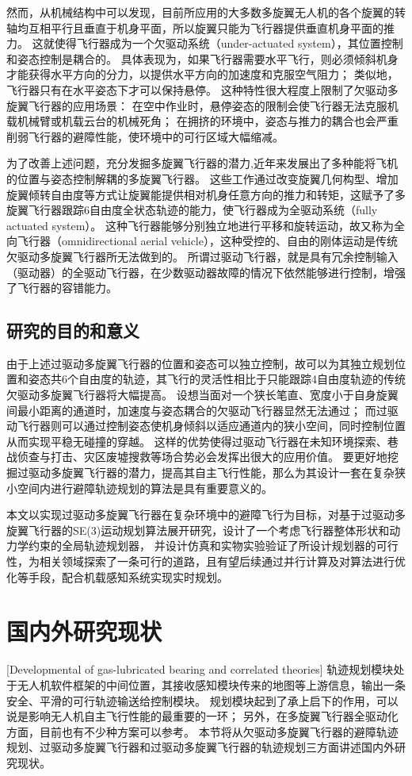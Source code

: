 然而，从机械结构中可以发现，目前所应用的大多数多旋翼无人机的各个旋翼的转轴均互相平行且垂直于机身平面，所以旋翼只能为飞行器提供垂直机身平面的推力。
这就使得飞行器成为一个欠驱动系统（under-actuated system）\cite{2012Underactuated}，其位置控制和姿态控制是耦合的。
具体表现为，如果飞行器需要水平飞行，则必须倾斜机身才能获得水平方向的分力，以提供水平方向的加速度和克服空气阻力；
类似地，飞行器只有在水平姿态下才可以保持悬停。
这种特性很大程度上限制了欠驱动多旋翼飞行器的应用场景：
在空中作业时，悬停姿态的限制会使飞行器无法克服机载机械臂或机载云台的机械死角；
在拥挤的环境中，姿态与推力的耦合也会严重削弱飞行器的避障性能，使环境中的可行区域大幅缩减。

为了改善上述问题，充分发掘多旋翼飞行器的潜力,近年来发展出了多种能将飞机的位置与姿态控制解耦的多旋翼飞行器。
这些工作通过改变旋翼几何构型、增加旋翼倾转自由度等方式让旋翼能提供相对机身任意方向的推力和转矩，这赋予了多旋翼飞行器跟踪6自由度全状态轨迹的能力，使飞行器成为全驱动系统（fully actuated system）。
这种飞行器能够分别独立地进行平移和旋转运动，故又称为全向飞行器（omnidirectional aerial vehicle），这种受控的、自由的刚体运动是传统欠驱动多旋翼飞行器所无法做到的。
所谓过驱动飞行器，就是具有冗余控制输入（驱动器）的全驱动飞行器，在少数驱动器故障的情况下依然能够进行控制，增强了飞行器的容错能力。


\subsection{研究的目的和意义}
由于上述过驱动多旋翼飞行器的位置和姿态可以独立控制，故可以为其独立规划位置和姿态共6个自由度的轨迹，其飞行的灵活性相比于只能跟踪4自由度轨迹的传统欠驱动多旋翼飞行器将大幅提高。
设想当面对一个狭长笔直、宽度小于自身旋翼间最小距离的通道时，加速度与姿态耦合的欠驱动飞行器显然无法通过；
而过驱动飞行器则可以通过控制姿态使机身倾斜以适应通道内的狭小空间，同时控制位置从而实现平稳无碰撞的穿越。
这样的优势使得过驱动飞行器在未知环境探索、巷战侦查与打击、灾区废墟搜救等场合势必会发挥出很大的应用价值。
要更好地挖掘过驱动多旋翼飞行器的潜力，提高其自主飞行性能，那么为其设计一套在复杂狭小空间内进行避障轨迹规划的算法是具有重要意义的。

本文以实现过驱动多旋翼飞行器在复杂环境中的避障飞行为目标，对基于过驱动多旋翼飞行器的SE(3)运动规划算法展开研究，设计了一个考虑飞行器整体形状和动力学约束的全局轨迹规划器，
并设计仿真和实物实验验证了所设计规划器的可行性，为相关领域探索了一条可行的道路，且有望后续通过并行计算及对算法进行优化等手段，配合机载感知系统实现实时规划。


\section{国内外研究现状}[Developmental of gas-lubricated bearing and correlated theories]
轨迹规划模块处于无人机软件框架的中间位置，其接收感知模块传来的地图等上游信息，输出一条安全、平滑的可行轨迹输送给控制模块。
规划模块起到了承上启下的作用，可以说是影响无人机自主飞行性能的最重要的一环；
另外，在多旋翼飞行器全驱动化方面，目前也有不少种方案可以参考。
本节将从欠驱动多旋翼飞行器的避障轨迹规划、过驱动多旋翼飞行器和过驱动多旋翼飞行器的轨迹规划三方面讲述国内外研究现状。

